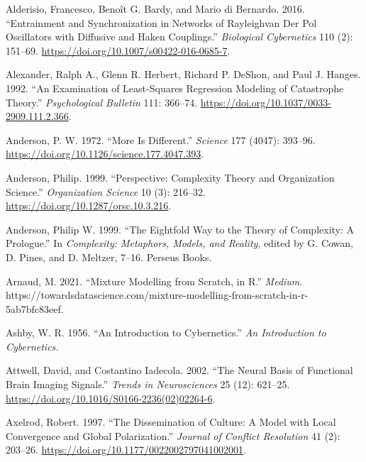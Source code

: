 \documentclass[
  a4paper,
  DIV=11,
  numbers=noendperiod,
  oneside]{scrreprt}
\newlength{\cslhangindent}
\newlength{\cslentryspacingunit} %
\newenvironment{CSLReferences}[2] %
 {%
  \setlength{\parindent}{0pt}
  \ifodd #1
  \let\oldpar\par
  \def\par{\hangindent=\cslhangindent\oldpar}
  \fi
  \setlength{\parskip}{#2\cslentryspacingunit}
 }%
 {}
\begin{document}
\begin{CSLReferences}{1}{0}
\leavevmode{}%
Alderisio, Francesco, Benoît G. Bardy, and Mario di Bernardo. 2016.
{``Entrainment and Synchronization in Networks of
{Rayleigh}\textendash van Der {Pol} Oscillators with Diffusive and
{Haken} Couplings.''}
\emph{Biological Cybernetics} 110 (2): 151--69.
\url{https://doi.org/10.1007/s00422-016-0685-7}.

\leavevmode{}%
Alexander, Ralph A., Glenn R. Herbert, Richard P. DeShon, and Paul J.
Hanges. 1992. {``An Examination of Least-Squares Regression Modeling of
Catastrophe Theory.''} \emph{Psychological Bulletin} 111: 366--74.
\url{https://doi.org/10.1037/0033-2909.111.2.366}.

\leavevmode{}%
Anderson, P. W. 1972. {``More {Is Different}.''} \emph{Science} 177
(4047): 393--96. \url{https://doi.org/10.1126/science.177.4047.393}.

\leavevmode{}%
Anderson, Philip. 1999. {``Perspective: {Complexity Theory} and
{Organization Science}.''} \emph{Organization Science} 10 (3): 216--32.
\url{https://doi.org/10.1287/orsc.10.3.216}.

\leavevmode{}%
Anderson, Philip W. 1999. {``The {Eightfold Way} to the {Theory} of
{Complexity}: {A Prologue}.''} In \emph{Complexity: Metaphors, Models,
and Reality}, edited by G. Cowan, D. Pines, and D. Meltzer, 7--16.
{Perseus Books}.

\leavevmode{}%
Arnaud, M. 2021. {``Mixture Modelling from Scratch, in {R}.''}
\emph{Medium}.
https://towardsdatascience.com/mixture-modelling-from-scratch-in-r-5ab7bfc83eef.

\leavevmode{}%
Ashby, W. R. 1956. {``An Introduction to Cybernetics.''} \emph{An
Introduction to Cybernetics.}

\leavevmode{}%
Attwell, David, and Costantino Iadecola. 2002. {``The Neural Basis of
Functional Brain Imaging Signals.''} \emph{Trends in Neurosciences} 25
(12): 621--25. \url{https://doi.org/10.1016/S0166-2236(02)02264-6}.

\leavevmode{}%
Axelrod, Robert. 1997. {``The {Dissemination} of {Culture}: {A Model}
with {Local Convergence} and {Global Polarization}.''} \emph{Journal of
Conflict Resolution} 41 (2): 203--26.
\url{https://doi.org/10.1177/0022002797041002001}.


\end{CSLReferences}
\end{document}
